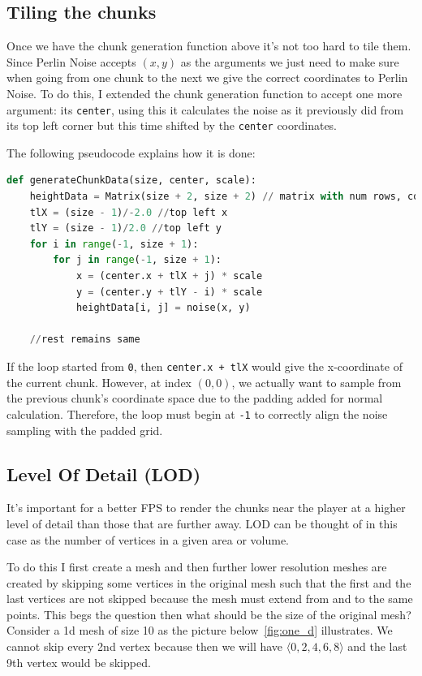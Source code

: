 \subsection{Tiling the chunks}
Once we have the chunk generation function above it's not too hard to tile them. Since Perlin Noise accepts $(x, y)$ as the arguments we just need to make sure when going from one chunk to the next we give the correct coordinates to Perlin Noise. To do this, I extended the chunk generation function to accept one more argument: its \texttt{center}, using this it calculates the noise as it previously did from its top left corner but this time shifted by the \texttt{center} coordinates.

The following pseudocode explains how it is done:
\begin{lstlisting}[language=Python]
def generateChunkData(size, center, scale):
	heightData = Matrix(size + 2, size + 2) // matrix with num rows, cols = size + 2
	tlX = (size - 1)/-2.0 //top left x
	tlY = (size - 1)/2.0 //top left y
	for i in range(-1, size + 1):
		for j in range(-1, size + 1):
			x = (center.x + tlX + j) * scale
			y = (center.y + tlY - i) * scale
			heightData[i, j] = noise(x, y)
	
	//rest remains same
\end{lstlisting}

If the loop started from \texttt{0}, then \texttt{center.x + tlX} would give the x-coordinate of the current chunk. However, at index $(0, 0)$, we actually want to sample from the previous chunk's coordinate space due to the padding added for normal calculation. Therefore, the loop must begin at \texttt{-1} to correctly align the noise sampling with the padded grid.

\subsection{Level Of Detail (LOD)}

It's important for a better FPS to render the chunks near the player at a higher level of detail than those that are further away. LOD can be thought of in this case as the number of vertices in a given area or volume.

To do this I first create a mesh and then further lower resolution meshes are created by skipping some vertices in the original mesh such that the first and the last vertices are not skipped because the mesh must extend from and to the same points. This begs the question then what should be the size of the original mesh? Consider a 1d mesh of size 10 as the picture below~\ref{fig:one_d} illustrates. We cannot skip every 2nd vertex because then we will have $\langle 0, 2, 4, 6, 8 \rangle$ and the last 9th vertex would be skipped.


